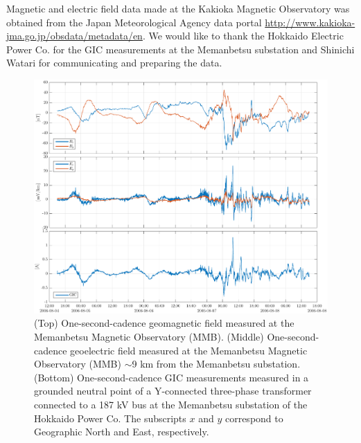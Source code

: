 \documentclass[draft,linenumbers]{agujournal2018}
\begin{document}
\acknowledgments
Magnetic and electric field data made at the Kakioka Magnetic Observatory was obtained from the Japan Meteorological Agency data portal \url{http://www.kakioka-jma.go.jp/obsdata/metadata/en}. We would like to thank the Hokkaido Electric Power Co. for the GIC measurements at the Memanbetsu substation and Shinichi Watari for communicating and preparing the data. 

\begin{figure}[h]
\centering
\includegraphics[width=\textwidth]{figures/plot_raw_All_20060805.pdf}
\caption{(Top) One-second-cadence geomagnetic field measured at the Memanbetsu Magnetic Observatory (MMB). (Middle) One-second-cadence geoelectric field measured at the Memanbetsu Magnetic Observatory (MMB) $\sim$9 km from the Memanbetsu substation. (Bottom) One-second-cadence GIC measurements measured in a grounded neutral point of a Y-connected three-phase transformer connected to a 187 kV bus at the Memanbetsu substation of the Hokkaido Power Co. The subscripts $x$ and $y$ correspond to Geographic North and East, respectively.}
\label{sample}
\end{figure}
\end{document}
